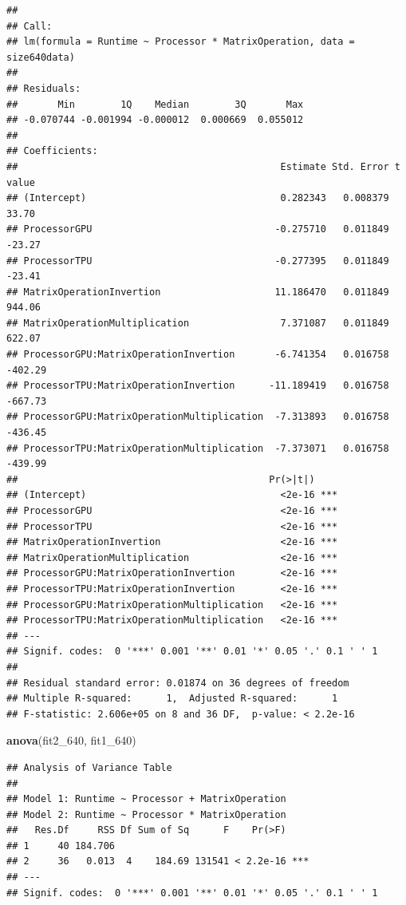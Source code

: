 \documentclass[
]{article}
\newenvironment{Shaded}{\begin{snugshade}}{\end{snugshade}}
\newcommand{\DecValTok}[1]{\textcolor[rgb]{0.00,0.00,0.81}{#1}}
\newcommand{\KeywordTok}[1]{\textcolor[rgb]{0.13,0.29,0.53}{\textbf{#1}}}
\newcommand{\NormalTok}[1]{#1}
\begin{document}
\begin{verbatim}
## 
## Call:
## lm(formula = Runtime ~ Processor * MatrixOperation, data = size640data)
## 
## Residuals:
##       Min        1Q    Median        3Q       Max 
## -0.070744 -0.001994 -0.000012  0.000669  0.055012 
## 
## Coefficients:
##                                              Estimate Std. Error t value
## (Intercept)                                  0.282343   0.008379   33.70
## ProcessorGPU                                -0.275710   0.011849  -23.27
## ProcessorTPU                                -0.277395   0.011849  -23.41
## MatrixOperationInvertion                    11.186470   0.011849  944.06
## MatrixOperationMultiplication                7.371087   0.011849  622.07
## ProcessorGPU:MatrixOperationInvertion       -6.741354   0.016758 -402.29
## ProcessorTPU:MatrixOperationInvertion      -11.189419   0.016758 -667.73
## ProcessorGPU:MatrixOperationMultiplication  -7.313893   0.016758 -436.45
## ProcessorTPU:MatrixOperationMultiplication  -7.373071   0.016758 -439.99
##                                            Pr(>|t|)    
## (Intercept)                                  <2e-16 ***
## ProcessorGPU                                 <2e-16 ***
## ProcessorTPU                                 <2e-16 ***
## MatrixOperationInvertion                     <2e-16 ***
## MatrixOperationMultiplication                <2e-16 ***
## ProcessorGPU:MatrixOperationInvertion        <2e-16 ***
## ProcessorTPU:MatrixOperationInvertion        <2e-16 ***
## ProcessorGPU:MatrixOperationMultiplication   <2e-16 ***
## ProcessorTPU:MatrixOperationMultiplication   <2e-16 ***
## ---
## Signif. codes:  0 '***' 0.001 '**' 0.01 '*' 0.05 '.' 0.1 ' ' 1
## 
## Residual standard error: 0.01874 on 36 degrees of freedom
## Multiple R-squared:      1,  Adjusted R-squared:      1 
## F-statistic: 2.606e+05 on 8 and 36 DF,  p-value: < 2.2e-16
\end{verbatim}

\begin{Shaded}
\begin{Highlighting}[]
\KeywordTok{anova}\NormalTok{(fit2\_}\DecValTok{640}\NormalTok{, fit1\_}\DecValTok{640}\NormalTok{)}
\end{Highlighting}
\end{Shaded}

\begin{verbatim}
## Analysis of Variance Table
## 
## Model 1: Runtime ~ Processor + MatrixOperation
## Model 2: Runtime ~ Processor * MatrixOperation
##   Res.Df     RSS Df Sum of Sq      F    Pr(>F)    
## 1     40 184.706                                  
## 2     36   0.013  4    184.69 131541 < 2.2e-16 ***
## ---
## Signif. codes:  0 '***' 0.001 '**' 0.01 '*' 0.05 '.' 0.1 ' ' 1
\end{verbatim}
\end{document}

